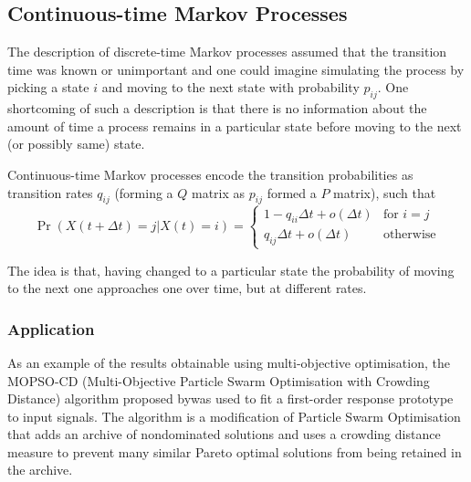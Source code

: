 \subsection{Continuous-time Markov Processes}
The description of discrete-time Markov processes assumed that the
transition time was known or unimportant and one could imagine
simulating the process by picking a state $i$ and moving to the next
state with probability $p_{ij}$.  One shortcoming of such a
description is that there is no information about the amount of time a
process remains in a particular state before moving to the next (or
possibly same) state.  

Continuous-time Markov processes encode the transition probabilities as
transition rates $q_{ij}$ (forming a $Q$ matrix as $p_{ij}$ formed a
$P$ matrix), such that
\begin{equation}
  \label{eq:contmarkov}
  \Pr(X(t+\Delta t) = j | X(t) = i) = 
  \begin{cases}
    1 - q_{ii}\Delta t + o(\Delta t) & \text{for } i = j \\
    q_{ij}\Delta t + o(\Delta t) & \text{otherwise}
  \end{cases}
\end{equation}

The idea is that, having changed to a particular state the probability of moving to the next one approaches one over time, but at different rates.


\subsubsection{Application}
As an example of the results obtainable using multi-objective
optimisation, the MOPSO-CD (Multi-Objective Particle Swarm
Optimisation with Crowding Distance) algorithm proposed by\cite{raquel_effective_2005}was used to fit a first-order response
prototype to input signals.  The algorithm is a modification of
Particle Swarm Optimisation that adds an archive of nondominated
solutions and uses a crowding distance measure to prevent many similar
Pareto optimal solutions from being retained in the archive.

